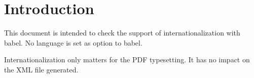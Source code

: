 \documentclass{article}
\begin{document}
\shorthandoff{=:!}
\section*{Introduction}
This document is intended to check the support of 
internationalization with \textsf{babel}. No language is 
set as option to \textsf{babel}.

Internationalization only matters for the PDF typesetting. 
It has no impact on the XML file generated.

\def\do#1{
\begin{otherlanguage}{#1}
\begin{abstract}#1/\languagename\end{abstract}
\begin{quiz}{#1}
\begin{description}[tags={#1}]{Description}Text\end{description}
\begin{cloze}{Cloze}
\begin{multi}[shuffle]{Multichoice}?\item* A\item B\end{multi}
\begin{multi}[multiple,shuffle=false]{Multianswer}?\item* A\item B\end{multi}
\begin{numerical}{Numerical}?\item0\end{numerical}
\begin{shortanswer}[usecase]{Shortanswer}?\item0\end{shortanswer}
\begin{shortanswer}[usecase=false]{Shortanswer}?\item0\end{shortanswer}
\end{cloze}
\begin{essay}[template={Default}]{Essay}Text\item Info\end{essay}
\begin{essay}[response format=html+file]{Essay}Text\end{essay}
\begin{essay}[response format=text]{Essay}Text\end{essay}
\begin{essay}[response format=monospaced]{Essay}Text\end{essay}

\end{quiz}
\end{otherlanguage}}
\end{document}
